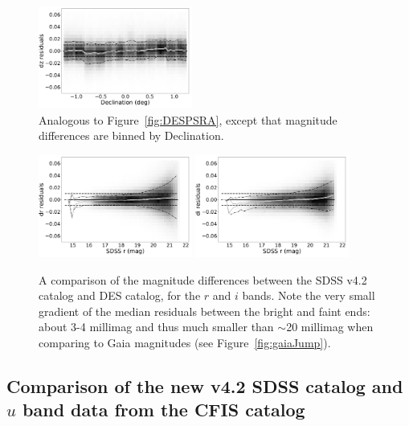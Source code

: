 \documentclass[fleqn,usenatbib]{mnras}
\begin{document}
\begin{figure}
    \centering\includegraphics[width=0.45\textwidth]{figures/colorResidPSDR2v42bright_dz_Dec_Hess.png}
\caption{Analogous to Figure~\ref{fig:DESPSRA}, except that magnitude differences
are binned by Declination.}
\label{fig:DESPSDec}
\end{figure}

\begin{figure}
    \centering\includegraphics[width=0.45\textwidth]{figures/colorResidDES42_dr_rmag_Hess.png}
    \centering\includegraphics[width=0.45\textwidth]{figures/colorResidDES42_di_rmag_Hess.png} 
\caption{A comparison of the magnitude differences between the SDSS v4.2 catalog
and DES catalog, for the $r$ and $i$ bands. Note the very small gradient of the median
residuals between the bright and faint ends: about 3-4 millimag and thus much smaller
than $\sim$20 millimag when comparing to Gaia magnitudes (see Figure~\ref{fig:gaiaJump}).} 
\label{fig:drVSr}
\end{figure}



\subsection{Comparison of the new v4.2 SDSS catalog and $u$ band data from the CFIS catalog  \label{sec:CFIStest}} 
\end{document}
